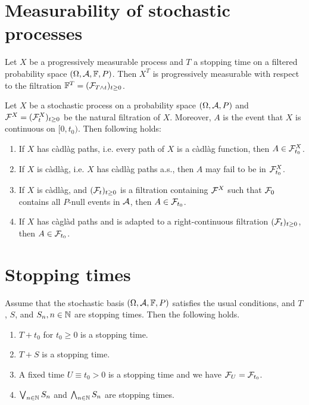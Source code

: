 \section{Measurability of stochastic processes}

 Let $X$ be a progressively
measurable process and $T$ a stopping time on a filtered probability space
$(\Omega, \mathcal A, \mathbb F, P)$. Then $X^{T}$ is progressively measurable with respect
to the filtration $\mathbb F^{T} = (\mathcal F_{T \wedge t})_{t\geq 0}$. 

 Let $X$ be a stochastic process
on a probability space $(\Omega, \mathcal A, P)$ and $\mathcal F^{X}=(\mathcal F^{X}_{t})_{t\geq 0}$
be the natural filtration of $X$. Moreover, $A$ is the event that $X$ is
continuous on $[0, t_0)$. Then following holds:
\begin{enumerate}
    \item If $X$ has c\`adl\`ag paths, i.e. every path of $X$ is a c\`adl\`ag
        function, then $A\in \mathcal F^{X}_{t_0}$. 

    \item If $X$ is c\`adl\`ag, i.e. $X$ has c\`adl\`ag paths a.s., then $A$
        may fail to be in $\mathcal F^{X}_{t_0}$.

    \item If $X$ is c\`adl\`ag, and $(\mathcal F_{t})_{t\geq 0}$ is a filtration
        containing $\mathcal F^{X}$ such that $\mathcal F_{0}$ contains all $P$-null events
        in $\mathcal A$, then $A\in \mathcal F_{t_0}$.

    \item If $X$ has c\`agl\`ad paths and is adapted to a right-continuous
        filtration $(\mathcal F_{t})_{t\geq 0}$, then $A\in \mathcal F_{t_{0}}$. 
\end{enumerate}


\section{Stopping times}

 Assume that the stochastic basis
$(\Omega, \mathcal A, \mathbb F, P)$ satisfies the usual conditions, and $T$, $S$, and $S_n,
n\in\mathbb N$ are stopping times. Then the following holds.
\begin{enumerate}
    \item $T + t_0$ for $t_0\geq 0$ is a stopping time.
    \item $T+S$ is a stopping time.
    \item A fixed time $U \equiv t_0>0$ is a stopping time and we have $\mathcal F_U = \mathcal F_{t_0}$.
    \item $\bigvee_{n\in\mathbb N} S_n$ and $\bigwedge_{n\in\mathbb N} S_n$ are stopping times. 
\end{enumerate}

